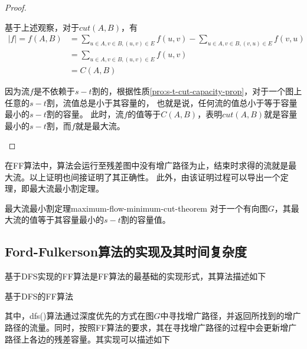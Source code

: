 \begin{proof}
\begin{enumerate}[a)]
			基于上述观察，对于\(cut(A,B)\)，有
			\begin{equation}\nonumber
				\begin{split}
				|f| = f(A, B)& = \sum_{u \in A, v \in B, (u,v) \in E} f(u,v) - \sum_{u \in A, v \in B, (v,u) \in E} f(v,u)\\
				& = \sum_{u \in A, v \in B, (u,v) \in E} f(u,v)\\
				& = C(A, B)
				\end{split}
			\end{equation}

			因为流\(f\)是不依赖于\(s-t\)割的，根据性质\ref{pro:s-t-cut-capacity-prop}，对于一个图上任意的\(s-t\)割，流值总是小于其容量的，
			也就是说，任何流的值总小于等于容量最小的\(s-t\)割的容量。
			此时，流\(f\)的值等于\(C(A,B)\)，表明\(cut(A,B)\)就是容量最小的\(s-t\)割，而\(f\)就是最大流。

	\end{enumerate}
\end{proof}

	\par 在FF算法中，算法会运行至残差图中没有增广路径为止，结束时求得的流就是最大流。以上证明也间接证明了其正确性。
	此外，由该证明过程可以导出一个定理，即最大流最小割定理。

\begin{theorem}{最大流最小割定理}{maximum-flow-minimum-cut-theorem}
	对于一个有向图\(G\)，其最大流的值等于其容量最小的\(s-t\)割的容量值。
\end{theorem}

\subsection{Ford-Fulkerson算法的实现及其时间复杂度}
\par 基于DFS实现的FF算法是FF算法的最基础的实现形式，其算法描述如下

\begin{algorithm}
\caption{基于DFS的FF算法}\label{alg:ford-fulkerson}

\end{algorithm}

\par 其中，dfs()算法通过深度优先的方式在图$G$中寻找增广路径，并返回所找到的增广路径的流量。同时，按照FF算法的要求，其在寻找增广路径的过程中会更新增广路径上各边的残差容量。其实现可以描述如下

